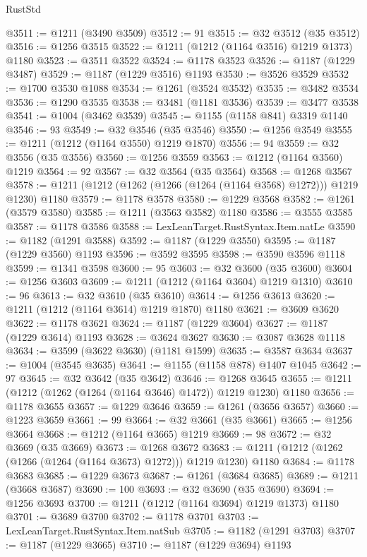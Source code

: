 \begin{lexlean}{RustStd}
\begin{coremodule}
@3511 := @1211 (@3490 @3509)
@3512 := 91
@3515 := @32 @3512 (@35 @3512)
@3516 := @1256 @3515
@3522 := @1211 (@1212 (@1164 @3516) @1219 @1373) @1180
@3523 := @3511 @3522
@3524 := @1178 @3523
@3526 := @1187 (@1229 @3487)
@3529 := @1187 (@1229 @3516) @1193
@3530 := @3526 @3529
@3532 := @1700 @3530 @1088
@3534 := @1261 (@3524 @3532)
@3535 := @3482 @3534
@3536 := @1290 @3535
@3538 := @3481 (@1181 @3536)
@3539 := @3477 @3538
@3541 := @1004 (@3462 @3539)
@3545 := @1155 (@1158 @841) @3319 @1140
@3546 := 93
@3549 := @32 @3546 (@35 @3546)
@3550 := @1256 @3549
@3555 := @1211 (@1212 (@1164 @3550) @1219 @1870)
@3556 := 94
@3559 := @32 @3556 (@35 @3556)
@3560 := @1256 @3559
@3563 := @1212 (@1164 @3560) @1219
@3564 := 92
@3567 := @32 @3564 (@35 @3564)
@3568 := @1268 @3567
@3578 := @1211 (@1212 (@1262 (@1266 (@1264 (@1164 @3568) @1272))) @1219 @1230) @1180
@3579 := @1178 @3578
@3580 := @1229 @3568
@3582 := @1261 (@3579 @3580)
@3585 := @1211 (@3563 @3582) @1180
@3586 := @3555 @3585
@3587 := @1178 @3586
@3588 := LexLeanTarget.RustSyntax.Item.natLe
@3590 := @1182 (@1291 @3588)
@3592 := @1187 (@1229 @3550)
@3595 := @1187 (@1229 @3560) @1193
@3596 := @3592 @3595
@3598 := @3590 @3596 @1118
@3599 := @1341 @3598
@3600 := 95
@3603 := @32 @3600 (@35 @3600)
@3604 := @1256 @3603
@3609 := @1211 (@1212 (@1164 @3604) @1219 @1310)
@3610 := 96
@3613 := @32 @3610 (@35 @3610)
@3614 := @1256 @3613
@3620 := @1211 (@1212 (@1164 @3614) @1219 @1870) @1180
@3621 := @3609 @3620
@3622 := @1178 @3621
@3624 := @1187 (@1229 @3604)
@3627 := @1187 (@1229 @3614) @1193
@3628 := @3624 @3627
@3630 := @3087 @3628 @1118
@3634 := @3599 (@3622 @3630) (@1181 @1599)
@3635 := @3587 @3634
@3637 := @1004 (@3545 @3635)
@3641 := @1155 (@1158 @878) @1407 @1045
@3642 := 97
@3645 := @32 @3642 (@35 @3642)
@3646 := @1268 @3645
@3655 := @1211 (@1212 (@1262 (@1264 (@1164 @3646) @1472)) @1219 @1230) @1180
@3656 := @1178 @3655
@3657 := @1229 @3646
@3659 := @1261 (@3656 @3657)
@3660 := @1223 @3659
@3661 := 99
@3664 := @32 @3661 (@35 @3661)
@3665 := @1256 @3664
@3668 := @1212 (@1164 @3665) @1219
@3669 := 98
@3672 := @32 @3669 (@35 @3669)
@3673 := @1268 @3672
@3683 := @1211 (@1212 (@1262 (@1266 (@1264 (@1164 @3673) @1272))) @1219 @1230) @1180
@3684 := @1178 @3683
@3685 := @1229 @3673
@3687 := @1261 (@3684 @3685)
@3689 := @1211 (@3668 @3687)
@3690 := 100
@3693 := @32 @3690 (@35 @3690)
@3694 := @1256 @3693
@3700 := @1211 (@1212 (@1164 @3694) @1219 @1373) @1180
@3701 := @3689 @3700
@3702 := @1178 @3701
@3703 := LexLeanTarget.RustSyntax.Item.natSub
@3705 := @1182 (@1291 @3703)
@3707 := @1187 (@1229 @3665)
@3710 := @1187 (@1229 @3694) @1193

\end{coremodule}
\end{lexlean}
